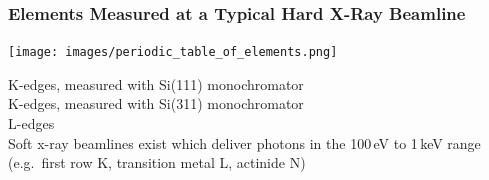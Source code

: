\documentclass[10pt, xcolor=x11names, compress]{beamer}
\begin{document}
\begin{frame}
\begin{columns}[T]
\begin{column}{0.5\linewidth}
{      }%
    \end{column}
    \begin{column}{0.5\linewidth}
      \begin{overlayarea}{\linewidth}{5in}
      \end{overlayarea}
    \end{column}
  \end{columns}


\end{frame}


\begin{frame}
  \frametitle{Elements Measured at a Typical Hard X-Ray Beamline}
  \begin{center}
    \texttt{[image: images/periodic\_table\_of\_elements.png]}

    {\color{SteelBlue3}K-edges, measured with Si(111) monochromator}\\
    {\color{Cyan3}K-edges, measured with Si(311) monochromator}\\
    {\color{Brown4}L-edges}\\[1ex]
    Soft x-ray beamlines exist which deliver photons in the 100\,eV to
    1\,keV range (e.g.\ first row K, transition metal L, actinide N)
  \end{center}
\end{frame}
\end{document}
